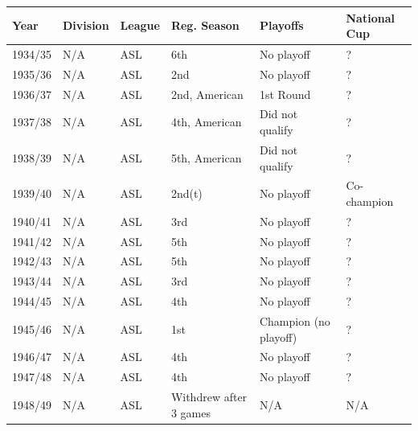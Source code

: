 \documentclass{article}
\begin{document}
\begin{tabular}{llllll}
\toprule
Year & Division & League & Reg. Season & Playoffs & National Cup \\
\midrule
1934/35 & N/A & ASL & 6th & No playoff & ? \\
1935/36 & N/A & ASL & 2nd & No playoff & ? \\
1936/37 & N/A & ASL & 2nd, American & 1st Round & ? \\
1937/38 & N/A & ASL & 4th, American & Did not qualify & ? \\
1938/39 & N/A & ASL & 5th, American & Did not qualify & ? \\
1939/40 & N/A & ASL & 2nd(t) & No playoff & Co-champion \\
1940/41 & N/A & ASL & 3rd & No playoff & ? \\
1941/42 & N/A & ASL & 5th & No playoff & ? \\
1942/43 & N/A & ASL & 5th & No playoff & ? \\
1943/44 & N/A & ASL & 3rd & No playoff & ? \\
1944/45 & N/A & ASL & 4th & No playoff & ? \\
1945/46 & N/A & ASL & 1st & Champion (no playoff) & ? \\
1946/47 & N/A & ASL & 4th & No playoff & ? \\
1947/48 & N/A & ASL & 4th & No playoff & ? \\
1948/49 & N/A & ASL & Withdrew after 3 games & N/A & N/A \\
\bottomrule
\end{tabular}
\end{document}
